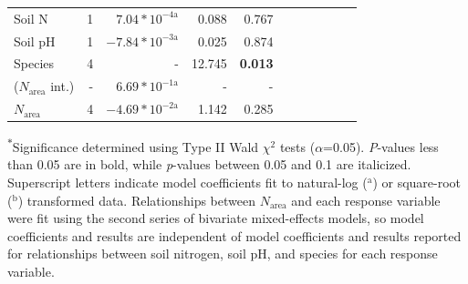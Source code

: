 \begin{landscape}
\begin{table}
{\begin{tabular}{p{2.5cm}p{0.5cm}p{2cm}p{1.5cm}p{1.5cm}p{2cm}p{1.5cm}p{1.5cm}p{2cm}p{1.5cm}p{1.5cm}}
            Soil N & \multicolumn{1}{r}{1}
            & \multicolumn{1}{r}{$7.04*10^{-4\mathrm{a}}$}  & \multicolumn{1}{r}{0.088} & \multicolumn{1}{r}{0.767}
            &&&&&& 
            \\

            Soil pH & \multicolumn{1}{r}{1}
            & \multicolumn{1}{r}{$-7.84*10^{-3\mathrm{a}}$} & \multicolumn{1}{r}{0.025} & \multicolumn{1}{r}{0.874}
            &&&&&& 
            \\

            Species & \multicolumn{1}{r}{4}
            & \multicolumn{1}{r}{-} & \multicolumn{1}{r}{12.745} & \multicolumn{1}{r}{\textbf{0.013}} \\
            \hline

            ($N_\mathrm{area}$ int.) & \multicolumn{1}{r}{-}
            & \multicolumn{1}{r}{$6.69*10^{-1\mathrm{a}}$} & \multicolumn{1}{r}{-} & \multicolumn{1}{r}{-}
            &&&&&& 
            \\

            $N_\mathrm{area}$ & \multicolumn{1}{r}{4}
            & \multicolumn{1}{r}{$-4.69*10^{-2\mathrm{a}}$} & \multicolumn{1}{r}{1.142} & \multicolumn{1}{r}{0.285}
            &&&&& \\
            \hline
        \end{tabular}}
        \label{tab:table3.2}
    \end{table}
\begin{singlespace}
    \noindent \textsuperscript{$*$}Significance determined using Type II Wald $\chi^{2}$ tests ($\alpha$=0.05). \textit{P}-values less than 0.05 are in bold, while \textit{p}-values between 0.05 and 0.1 are italicized. Superscript letters indicate model coefficients fit to natural-log ($^\mathrm{a}$) or square-root ($^\mathrm{b}$) transformed data. Relationships between $N_\mathrm{area}$ and each response variable were fit using the second series of bivariate mixed-effects models, so model coefficients and results are independent of model coefficients and results reported for relationships between soil nitrogen, soil pH, and species for each response variable.
\end{singlespace}
\end{landscape}
\clearpage

